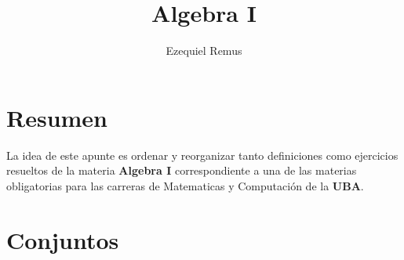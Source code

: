 \documentclass[10pt]{article}
\title{\bfseries \huge {Algebra I}}
\author{Ezequiel Remus}
\date{}
\begin{document}
\renewcommand{\tablename}{Tabla}
\maketitle
\newpage
\section*{Resumen}
La idea de este apunte es ordenar y reorganizar tanto definiciones como ejercicios resueltos de la materia \textbf{Algebra I} correspondiente a una de las materias 
obligatorias para las carreras de Matematicas y Computación de la \textbf{UBA}. 
\tableofcontents
\newpage
\section{Conjuntos}
\end{document}
